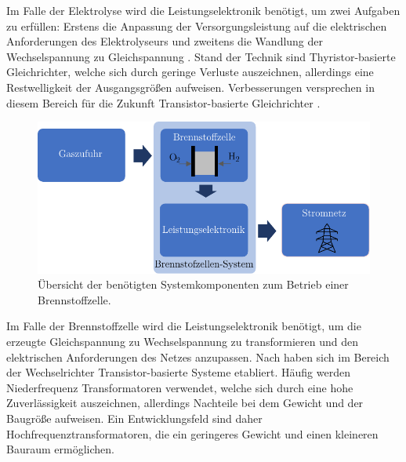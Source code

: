 Im Falle der Elektrolyse wird die Leistungselektronik benötigt, um zwei Aufgaben zu erfüllen:
Erstens die Anpassung der Versorgungsleistung auf die elektrischen Anforderungen des Elektrolyseurs und zweitens die Wandlung der Wechselspannung zu Gleichspannung \citep{tjarks_pem-elektrolyse-systeme_2017}.
Stand der Technik sind Thyristor-basierte Gleichrichter, welche sich durch geringe Verluste auszeichnen, allerdings eine Restwelligkeit der Ausgangsgrößen aufweisen.
Verbesserungen versprechen in diesem Bereich für die Zukunft Transistor-basierte Gleichrichter \citep{tjarks_pem-elektrolyse-systeme_2017}.

\begin{figure}[h]
	\centering
		\includegraphics[scale=1]{Figures/BrennstoffzelleProzessschritte}
		\caption{Übersicht der benötigten Systemkomponenten zum Betrieb einer Brennstoffzelle.}
\label{fig:ProzessBrennstoffzelle}	
\end{figure}

Im Falle der Brennstoffzelle wird die Leistungselektronik benötigt, um die erzeugte Gleichspannung zu Wechselspannung zu transformieren und den elektrischen Anforderungen des Netzes anzupassen.
Nach \citet{engler_wechselrichter_nodate} haben sich im Bereich der Wechselrichter Transistor-basierte Systeme etabliert.
Häufig werden Niederfrequenz Transformatoren verwendet, welche sich durch eine hohe Zuverlässigkeit auszeichnen, allerdings Nachteile bei dem Gewicht und der Baugröße aufweisen.
Ein Entwicklungsfeld sind daher Hochfrequenztransformatoren, die ein geringeres Gewicht und einen kleineren Bauraum ermöglichen.